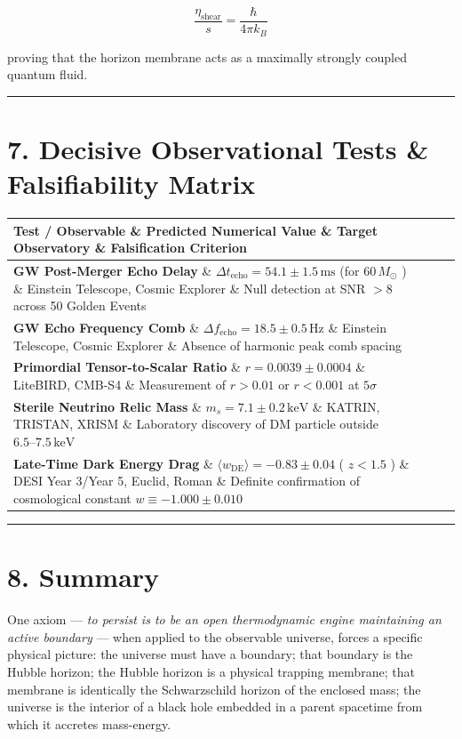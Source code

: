 \documentclass[11pt,a4paper]{article}
\theoremstyle{definition}\newtheorem{definition}{Definition}
\theoremstyle{remark}\newtheorem{remark}{Remark}
\begin{document}
\begin{equation}
\frac{\eta_{\text{shear}}}{s} = \frac{\hbar}{4\pi k_B}
\end{equation}


proving that the horizon membrane acts as a maximally strongly coupled quantum fluid.

\noindent\rule{\linewidth}{0.4pt}
\section{7. Decisive Observational Tests \& Falsifiability Matrix}

\begin{longtable}{llll}
\hline
Test / Observable \& Predicted Numerical Value \& Target Observatory \& Falsification Criterion \\
\hline
\textbf{GW Post-Merger Echo Delay} \& $\Delta t_{\text{echo}} = 54.1 \pm 1.5\,\text{ms}$ (for $60\,M_\odot$ ) \& Einstein Telescope, Cosmic Explorer \& Null detection at SNR $> 8$ across 50 Golden Events \\
\textbf{GW Echo Frequency Comb} \& $\Delta f_{\text{echo}} = 18.5 \pm 0.5\,\text{Hz}$ \& Einstein Telescope, Cosmic Explorer \& Absence of harmonic peak comb spacing \\
\textbf{Primordial Tensor-to-Scalar Ratio} \& $r = 0.0039 \pm 0.0004$ \& LiteBIRD, CMB-S4 \& Measurement of $r > 0.01$ or $r < 0.001$ at $5\sigma$ \\
\textbf{Sterile Neutrino Relic Mass} \& $m_s = 7.1 \pm 0.2\,\text{keV}$ \& KATRIN, TRISTAN, XRISM \& Laboratory discovery of DM particle outside $6.5\text{--}7.5\,\text{keV}$ \\
\textbf{Late-Time Dark Energy Drag} \& $\langle w_{\text{DE}} \rangle = -0.83 \pm 0.04$ ( $z < 1.5$ ) \& DESI Year 3/Year 5, Euclid, Roman \& Definite confirmation of cosmological constant $w \equiv -1.000 \pm 0.010$ \\
\hline
\end{longtable}
\noindent\rule{\linewidth}{0.4pt}
\section{8. Summary}

One axiom — \textit{to persist is to be an open thermodynamic engine maintaining an active boundary} — when applied to the observable universe, forces a specific physical picture: the universe must have a boundary; that boundary is the Hubble horizon; the Hubble horizon is a physical trapping membrane; that membrane is identically the Schwarzschild horizon of the enclosed mass; the universe is the interior of a black hole embedded in a parent spacetime from which it accretes mass-energy.
\end{document}
